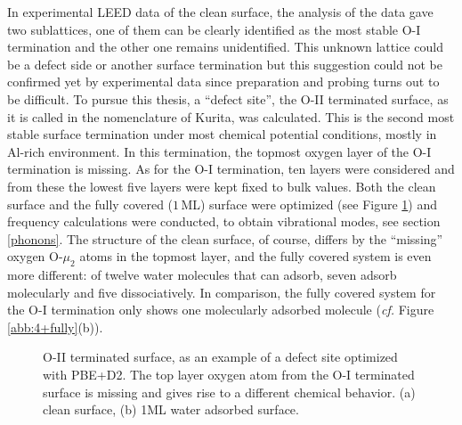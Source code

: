 \documentclass[11pt,DIV=13,BCOR=5mm,a4paper,headinclude]{scrbook}
\begin{document}
In experimental LEED data of the clean surface, the analysis of the data gave two sublattices, one of them can be clearly identified as the most stable O-I termination and the other one remains unidentified.
This unknown lattice could be a defect side or another surface termination but this suggestion could not be confirmed yet by experimental data since preparation and probing turns out to be difficult.
To pursue this thesis, a ``defect site'', the O-II terminated surface, as it is called in the nomenclature of Kurita\cite{kuri10}, was calculated.
This is the second most stable surface termination under most chemical potential conditions, mostly in Al-rich environment.
In this termination, the topmost oxygen layer of the O-I termination is missing.
As for the O-I termination, ten layers were considered and from these the lowest five layers were kept fixed to bulk values.
Both the clean surface and the fully covered ($1\,$ML) surface were optimized (see Figure \ref{abb:O-II-geom}) and frequency calculations were conducted, to obtain vibrational modes, see section \ref{phonons}.
The structure of the clean surface, of course, differs by the ``missing'' oxygen O-$\mu_2$ atoms in the topmost layer, and the fully covered system is even more different: of twelve water molecules that can adsorb, seven adsorb molecularly and five dissociatively.
In comparison, the fully covered system for the O-I termination only shows one molecularly adsorbed molecule (\textit{cf.} Figure \ref{abb:4+fully}(b)).
 \begin{figure}[!ht]
 \centering
{}
 \quad\quad
 \caption{O-II terminated surface, as an example of a defect site optimized with PBE+D2.
The top layer oxygen atom from the O-I terminated surface is missing and gives rise to a different chemical behavior.
(a) clean surface, (b) 1ML water adsorbed surface.}
        \label{abb:O-II-geom}
 \end{figure}
\end{document}
